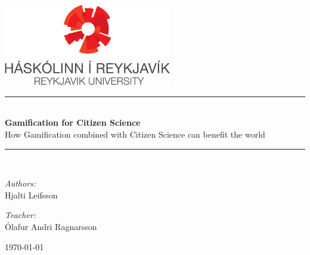  \newcommand{\HRule}{\rule{\linewidth}{0.5mm}}
\begin{titlepage}

\begin{center}
\includegraphics[width=0.55\textwidth]{./graphics/rulogo}\\[4.0cm]


\HRule \\[0.4cm]
{ \Huge \bfseries Gamification for Citizen Science } \\[0.2cm]

\Large How Gamification combined with Citizen Science can benefit the world \\[0.1cm]

\HRule \\[1.5cm]


\begin{minipage}{0.49\textwidth}
\begin{flushleft} \large
\emph{Authors:}\\
Hjalti Leifsson
\end{flushleft}
\end{minipage}
\begin{minipage}{0.49\textwidth}
\begin{flushright} \large
\emph{Teacher:} \\
Ólafur Andri Ragnarsson
\end{flushright}
\end{minipage}

\vfill

{\large \today}



\end{center}

\end{titlepage}